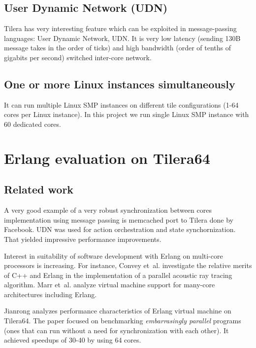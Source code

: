 \documentclass[english,11pt]{article}
\begin{document}
\subsection{User Dynamic Network (UDN)}

Tilera has very interesting feature which can be exploited in message-passing
languages: User Dynamic Network, UDN. It is very low latency (sending 130B
message takes in the order of ticks) and high bandwidth (order of tenths of
gigabits per second) switched inter-core network.

\subsection{One or more Linux instances simultaneously}

It can run multiple Linux SMP instances on different tile configurations (1-64
cores per Linux instance). In this project we run single Linux SMP instance with
60 dedicated cores.

\section{Erlang evaluation on Tilera64}
\label{sec:erlang-eval}

\subsection{Related work}

A very good example of a very robust synchronization between cores
implementation using message passing is memcached port to Tilera done by
Facebook. UDN was used for action orchestration and state
synchornization\cite{facebook-tilera}. That yielded impressive performance
improvements.

Interest in suitability of software development with Erlang on multi-core
processors is increasing. For instance, Convey et~al.\cite{erlang-acoustic}
investigate the relative merits of C++ and Erlang in the implementation of a
parallel acoustic ray tracing algorithm. Marr et~al.\cite{vm-manycore} analyze
virtual machine support for many-core architectures including Erlang.

Jianrong \cite{erlang-manycore-scalability} analyzes performance characteristics
of Erlang virtual machine on Tilera64. The paper focused on benchmarking
\emph{embarrasingly parallel} programs (ones that can run without a need for
synchronization with each other). It achieved speedups of 30-40 by using 64
cores.
\end{document}
